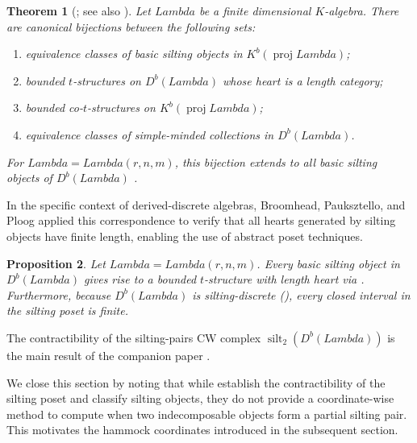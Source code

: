 \documentclass[11pt, a4paper]{article}
\newtheorem{theorem}{Theorem}[section]
\newtheorem{proposition}[theorem]{Proposition}
\theoremstyle{definition}
\def\Lambda{Lambda}%
\def\mathcal#1{#1}%
\def\Db{D^b}%
\newcommand{\Db}{\mathcal{D}^b}
\begin{document}
\begin{theorem}[{\cite[Theorem~0.1]{KY2014}; see also \cite[Section~6]{BPP2017}}]\label{thm:KY}
Let $\Lambda$ be a finite dimensional $K$-algebra. There are canonical bijections between the following sets:
\begin{enumerate}[label=\textup{(\roman*)}]
\item equivalence classes of basic silting objects in $K^b(\operatorname{proj}\Lambda)$;
\item bounded $t$-structures on $\Db(\Lambda)$ whose heart is a length category;
\item bounded co-$t$-structures on $K^b(\operatorname{proj}\Lambda)$;
\item equivalence classes of simple-minded collections in $\Db(\Lambda)$.
\end{enumerate}
For $\Lambda = \Lambda(r,n,m)$, this bijection extends to all basic silting objects of $\Db(\Lambda)$ \cite[Theorem~6.12]{BPP2017}.
\end{theorem}

In the specific context of derived-discrete algebras, Broomhead, Pauksztello, and Ploog applied this correspondence to verify that all hearts generated by silting objects have finite length, enabling the use of abstract poset techniques.

\begin{proposition}\label{prop:algebraic-t-str}
Let $\Lambda = \Lambda(r,n,m)$. Every basic silting object in $\Db(\Lambda)$ gives rise to a bounded $t$-structure with length heart via . Furthermore, because $\Db(\Lambda)$ is silting-discrete (), every closed interval in the silting poset is finite.
\end{proposition}

The contractibility of the silting-pairs CW complex $\operatorname{silt}_2(\Db(\Lambda))$ is the main result of the companion paper \cite{BPP2016}.

We close this section by noting that while \cite{BPP2017,BPP2016} establish the contractibility of the silting poset and classify silting objects, they do not provide a coordinate-wise method to compute when two indecomposable objects form a partial silting pair. This motivates the hammock coordinates introduced in the subsequent section.


\end{document}
